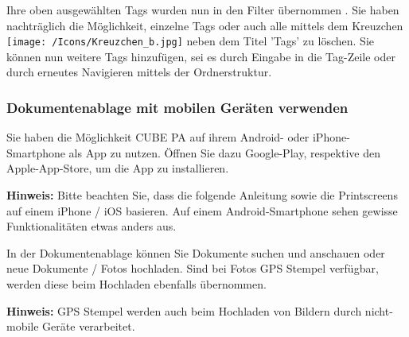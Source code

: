 Ihre oben ausgewählten Tags wurden nun in den Filter übernommen . Sie haben nachträglich die Möglichkeit, einzelne Tags oder auch alle mittels dem Kreuzchen \texttt{[image: /Icons/Kreuzchen\_b.jpg]} neben dem Titel 'Tags' zu löschen. Sie können nun weitere Tags hinzufügen, sei es durch Eingabe in die Tag-Zeile oder durch erneutes Navigieren mittels der Ordnerstruktur.

\vspace{\baselineskip}

\subsubsection{Dokumentenablage mit mobilen Geräten verwenden}

Sie haben die Möglichkeit CUBE PA auf ihrem Android- oder iPhone-Smartphone als App zu nutzen. Öffnen Sie dazu Google-Play, respektive den Apple-App-Store, um die App zu installieren.

\vspace{\baselineskip}

\textbf{Hinweis:} Bitte beachten Sie, dass die folgende Anleitung sowie die Printscreens auf einem iPhone / iOS basieren. Auf einem Android-Smartphone sehen gewisse Funktionalitäten etwas anders aus.

\vspace{\baselineskip}

In der Dokumentenablage können Sie Dokumente suchen und anschauen oder neue Dokumente / Fotos hochladen. Sind bei Fotos GPS Stempel verfügbar, werden diese beim Hochladen ebenfalls übernommen. 

\vspace{\baselineskip}

\textbf{Hinweis:} GPS Stempel werden auch beim Hochladen von Bildern durch nicht-mobile Geräte verarbeitet.

\pagebreak


